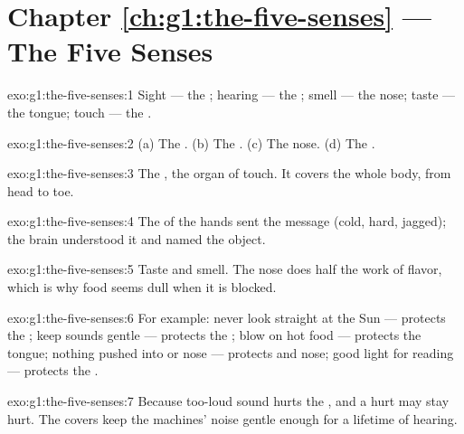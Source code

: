 \section*{Chapter \ref{ch:g1:the-five-senses} --- The Five Senses}

\begin{solution}{exo:g1:the-five-senses:1}
Sight --- the ; hearing --- the ; smell --- the nose;
taste --- the tongue; touch --- the .
\end{solution}

\begin{solution}{exo:g1:the-five-senses:2}
(a) The . (b) The . (c) The nose. (d) The .
\end{solution}

\begin{solution}{exo:g1:the-five-senses:3}
The , the organ of touch. It covers the whole body, from head
to toe.
\end{solution}

\begin{solution}{exo:g1:the-five-senses:4}
The  of the hands sent the message (cold, hard, jagged); the
brain understood it and named the object.
\end{solution}

\begin{solution}{exo:g1:the-five-senses:5}
Taste and smell. The nose does half the work of flavor, which is
why food seems dull when it is blocked.
\end{solution}

\begin{solution}{exo:g1:the-five-senses:6}
For example: never look straight at the Sun --- protects the ;
keep sounds gentle --- protects the ; blow on hot food ---
protects the tongue; nothing pushed into  or nose --- protects
 and nose; good light for reading --- protects the .
\end{solution}

\begin{solution}{exo:g1:the-five-senses:7}
Because too-loud sound hurts the , and a hurt  may stay
hurt. The covers keep the machines' noise gentle enough for a
lifetime of hearing.
\end{solution}

